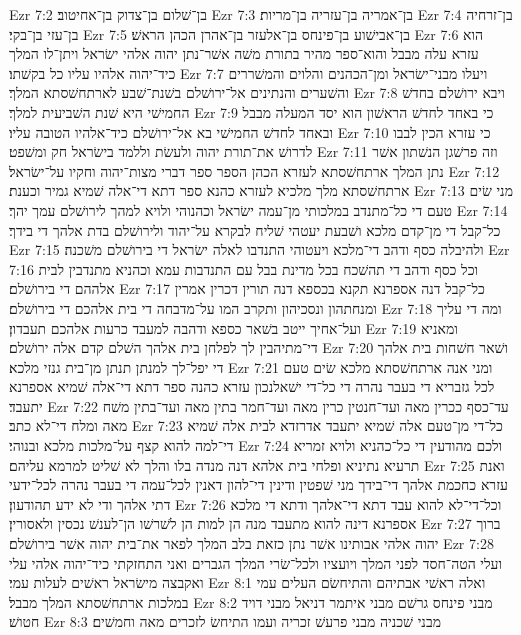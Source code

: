Ezr 7:2  בן־שׁלום בן־צדוק בן־אחיטוב׃
Ezr 7:3  בן־אמריה בן־עזריה בן־מריות׃
Ezr 7:4  בן־זרחיה בן־עזי בן־בקי׃
Ezr 7:5  בן־אבישׁוע בן־פינחס בן־אלעזר בן־אהרן הכהן הראשׁ׃
Ezr 7:6  הוא עזרא עלה מבבל והוא־ספר מהיר בתורת משׁה אשׁר־נתן יהוה אלהי ישׂראל ויתן־לו המלך כיד־יהוה אלהיו עליו כל בקשׁתו׃
Ezr 7:7  ויעלו מבני־ישׂראל ומן־הכהנים והלוים והמשׁררים והשׁערים והנתינים אל־ירושׁלם בשׁנת־שׁבע לארתחשׁסתא המלך׃
Ezr 7:8  ויבא ירושׁלם בחדשׁ החמישׁי היא שׁנת השׁביעית למלך׃
Ezr 7:9  כי באחד לחדשׁ הראשׁון הוא יסד המעלה מבבל ובאחד לחדשׁ החמישׁי בא אל־ירושׁלם כיד־אלהיו הטובה עליו׃
Ezr 7:10  כי עזרא הכין לבבו לדרושׁ את־תורת יהוה ולעשׂת וללמד בישׂראל חק ומשׁפט׃
Ezr 7:11  וזה פרשׁגן הנשׁתון אשׁר נתן המלך ארתחשׁסתא לעזרא הכהן הספר ספר דברי מצות־יהוה וחקיו על־ישׂראל׃
Ezr 7:12  ארתחשׁסתא מלך מלכיא לעזרא כהנא ספר דתא די־אלה שׁמיא גמיר וכענת׃
Ezr 7:13  מני שׂים טעם די כל־מתנדב במלכותי מן־עמה ישׂראל וכהנוהי ולויא למהך לירושׁלם עמך יהך׃
Ezr 7:14  כל־קבל די מן־קדם מלכא ושׁבעת יעטהי שׁליח לבקרא על־יהוד ולירושׁלם בדת אלהך די בידך׃
Ezr 7:15  ולהיבלה כסף ודהב די־מלכא ויעטוהי התנדבו לאלה ישׂראל די בירושׁלם משׁכנה׃
Ezr 7:16  וכל כסף ודהב די תהשׁכח בכל מדינת בבל עם התנדבות עמא וכהניא מתנדבין לבית אלההם די בירושׁלם׃
Ezr 7:17  כל־קבל דנה אספרנא תקנא בכספא דנה תורין דכרין אמרין ומנחתהון ונסכיהון ותקרב המו על־מדבחה די בית אלהכם די בירושׁלם׃
Ezr 7:18  ומה די עליך ועל־אחיך ייטב בשׁאר כספא ודהבה למעבד כרעות אלהכם תעבדון׃
Ezr 7:19  ומאניא די־מתיהבין לך לפלחן בית אלהך השׁלם קדם אלה ירושׁלם׃
Ezr 7:20  ושׁאר חשׁחות בית אלהך די יפל־לך למנתן תנתן מן־בית גנזי מלכא׃
Ezr 7:21  ומני אנה ארתחשׁסתא מלכא שׂים טעם לכל גזבריא די בעבר נהרה די כל־די ישׁאלנכון עזרא כהנה ספר דתא די־אלה שׁמיא אספרנא יתעבד׃
Ezr 7:22  עד־כסף ככרין מאה ועד־חנטין כרין מאה ועד־חמר בתין מאה ועד־בתין משׁח מאה ומלח די־לא כתב׃
Ezr 7:23  כל־די מן־טעם אלה שׁמיא יתעבד אדרזדא לבית אלה שׁמיא די־למה להוא קצף על־מלכות מלכא ובנוהי׃
Ezr 7:24  ולכם מהודעין די כל־כהניא ולויא זמריא תרעיא נתיניא ופלחי בית אלהא דנה מנדה בלו והלך לא שׁליט למרמא עליהם׃
Ezr 7:25  ואנת עזרא כחכמת אלהך די־בידך מני שׁפטין ודינין די־להון דאנין לכל־עמה די בעבר נהרה לכל־ידעי דתי אלהך ודי לא ידע תהודעון׃
Ezr 7:26  וכל־די־לא להוא עבד דתא די־אלהך ודתא די מלכא אספרנא דינה להוא מתעבד מנה הן למות הן לשׁרשׁו הן־לענשׁ נכסין ולאסורין׃
Ezr 7:27  ברוך יהוה אלהי אבותינו אשׁר נתן כזאת בלב המלך לפאר את־בית יהוה אשׁר בירושׁלם׃
Ezr 7:28  ועלי הטה־חסד לפני המלך ויועציו ולכל־שׂרי המלך הגברים ואני התחזקתי כיד־יהוה אלהי עלי ואקבצה מישׂראל ראשׁים לעלות עמי׃
Ezr 8:1  ואלה ראשׁי אבתיהם והתיחשׂם העלים עמי במלכות ארתחשׁסתא המלך מבבל׃
Ezr 8:2  מבני פינחס גרשׁם מבני איתמר דניאל מבני דויד חטושׁ׃
Ezr 8:3  מבני שׁכניה מבני פרעשׁ זכריה ועמו התיחשׂ לזכרים מאה וחמשׁים׃
